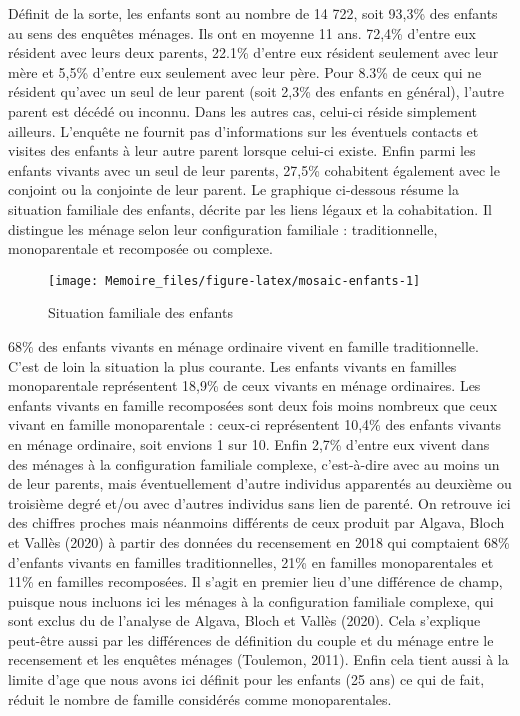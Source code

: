 \documentclass[
  12pt,
]{book}
\begin{document}
Définit de la sorte, les enfants sont au nombre de 14 722, soit 93,3\%
des enfants au sens des enquêtes ménages. Ils ont en moyenne 11 ans.
72,4\% d'entre eux résident avec leurs deux parents, 22.1\% d'entre eux
résident seulement avec leur mère et 5,5\% d'entre eux seulement avec
leur père. Pour 8.3\% de ceux qui ne résident qu'avec un seul de leur
parent (soit 2,3\% des enfants en général), l'autre parent est décédé ou
inconnu. Dans les autres cas, celui-ci réside simplement ailleurs.
L'enquête ne fournit pas d'informations sur les éventuels contacts et
visites des enfants à leur autre parent lorsque celui-ci existe. Enfin
parmi les enfants vivants avec un seul de leur parents, 27,5\%
cohabitent également avec le conjoint ou la conjointe de leur parent. Le
graphique ci-dessous résume la situation familiale des enfants, décrite
par les liens légaux et la cohabitation. Il distingue les ménage selon
leur configuration familiale : traditionnelle, monoparentale et
recomposée ou complexe.

\begin{figure}[h]

{\centering \texttt{[image: Memoire\_files/figure-latex/mosaic-enfants-1]} 

}

\caption{Situation familiale des enfants}\label{fig:mosaic-enfants}
\end{figure}

68\% des enfants vivants en ménage ordinaire vivent en famille
traditionnelle. C'est de loin la situation la plus courante. Les enfants
vivants en familles monoparentale représentent 18,9\% de ceux vivants en
ménage ordinaires. Les enfants vivants en famille recomposées sont deux
fois moins nombreux que ceux vivant en famille monoparentale : ceux-ci
représentent 10,4\% des enfants vivants en ménage ordinaire, soit
envions 1 sur 10. Enfin 2,7\% d'entre eux vivent dans des ménages à la
configuration familiale complexe, c'est-à-dire avec au moins un de leur
parents, mais éventuellement d'autre individus apparentés au deuxième ou
troisième degré et/ou avec d'autres individus sans lien de parenté. On
retrouve ici des chiffres proches mais néanmoins différents de ceux
produit par Algava, Bloch et Vallès (2020) à partir des données du
recensement en 2018 qui comptaient 68\% d'enfants vivants en familles
traditionnelles, 21\% en familles monoparentales et 11\% en familles
recomposées. Il s'agit en premier lieu d'une différence de champ,
puisque nous incluons ici les ménages à la configuration familiale
complexe, qui sont exclus du de l'analyse de Algava, Bloch et Vallès
(2020). Cela s'explique peut-être aussi par les différences de
définition du couple et du ménage entre le recensement et les enquêtes
ménages (Toulemon, 2011). Enfin cela tient aussi à la limite d'age que
nous avons ici définit pour les enfants (25 ans) ce qui de fait, réduit
le nombre de famille considérés comme monoparentales.
\end{document}
